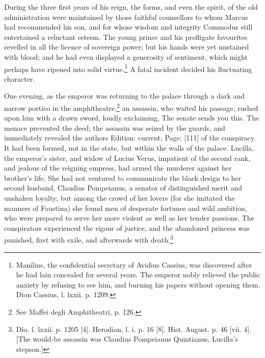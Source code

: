 During the three first years of his reign, the forms, and even the spirit, of the old administration were maintained by those faithful counsellors to whom Marcus had recommended his son, and for whose wisdom and integrity Commodus still entertained a reluctant esteem. The young prince and his profligate favourites revelled in all the licence of sovereign power; but his hands were yet unstained with blood; and he had even displayed a generosity of sentiment, which might perhaps have ripened into solid virtue.\footnote{Manilius, the confidential secretary of Avidius Cassius, was discovered after he had lain concealed for several years. The emperor nobly relieved the public anxiety by refusing to see him, and burning his papers without opening them. Dion Cassius, l. lxxii. p. 1209.} A fatal incident decided his fluctuating character.

One evening, as the emperor was returning to the palace through a dark and narrow portico in the amphitheatre,\footnote{See Maffei degli Amphitheatri, p. 126.} an assassin, who waited his passage, rushed upon him with a drawn sword, loudly exclaiming, The senate sends you this. The menace prevented the deed; the assassin was seized by the guards, and immediately revealed the authors Edition: current; Page: [111] of the conspiracy. It had been formed, not in the state, but within the walls of the palace. Lucilla, the emperor\texthebrew{}’s sister, and widow of Lucius Verus, impatient of the second rank, and jealous of the reigning empress, had armed the murderer against her brother\texthebrew{}’s life. She had not ventured to communicate the black design to her second husband, Claudius Pompeianus, a senator of distinguished merit and unshaken loyalty; but among the crowd of her lovers (for she imitated the manners of Faustina) she found men of desperate fortunes and wild ambition, who were prepared to serve her more violent as well as her tender passions. The conspirators experienced the rigour of justice, and the abandoned princess was punished, first with exile, and afterwards with death.\footnote{Dio. l. lxxii. p. 1205 [4]. Herodian, l. i. p. 16 [8]. Hist. August. p. 46 [vii. 4]. [The would-be assassin was Claudius Pompeianus Quintianus, Lucilla\texthebrew{}’s stepson.]}

